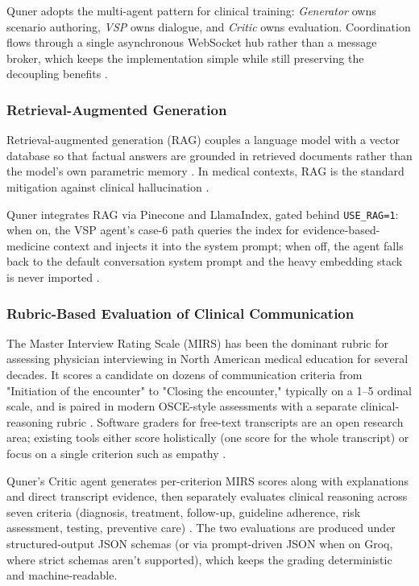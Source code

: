 \documentclass{article}
\begin{document}
Quner adopts the multi-agent pattern for clinical training: \emph{Generator} owns scenario authoring, \emph{VSP} owns dialogue, and \emph{Critic} owns evaluation. Coordination flows through a single asynchronous WebSocket hub rather than a message broker, which keeps the implementation simple while still preserving the decoupling benefits \cite{Cheptsov2013IntroducingAN}.

\subsubsection{Retrieval-Augmented Generation}

Retrieval-augmented generation (RAG) couples a language model with a vector database so that factual answers are grounded in retrieved documents rather than the model's own parametric memory \cite{Monir2024VectorSearchED,Rygl2017SemanticVE}. In medical contexts, RAG is the standard mitigation against clinical hallucination \cite{Mahajan2022TextualDQ}.

Quner integrates RAG via Pinecone and LlamaIndex, gated behind \texttt{USE\_RAG=1}: when on, the VSP agent's case-6 path queries the index for evidence-based-medicine context and injects it into the system prompt; when off, the agent falls back to the default conversation system prompt and the heavy embedding stack is never imported \cite{Zhao2023ASO}.

\subsubsection{Rubric-Based Evaluation of Clinical Communication}

The Master Interview Rating Scale (MIRS) has been the dominant rubric for assessing physician interviewing in North American medical education for several decades. It scores a candidate on dozens of communication criteria from "Initiation of the encounter" to "Closing the encounter," typically on a 1--5 ordinal scale, and is paired in modern OSCE-style assessments with a separate clinical-reasoning rubric \cite{Mahajan2022TextualDQ}. Software graders for free-text transcripts are an open research area; existing tools either score holistically (one score for the whole transcript) or focus on a single criterion such as empathy \cite{Krugmann2024SentimentAI}.

Quner's Critic agent generates per-criterion MIRS scores along with explanations and direct transcript evidence, then separately evaluates clinical reasoning across seven criteria (diagnosis, treatment, follow-up, guideline adherence, risk assessment, testing, preventive care) \cite{Krugmann2024SentimentAI}. The two evaluations are produced under structured-output JSON schemas (or via prompt-driven JSON when on Groq, where strict schemas aren't supported), which keeps the grading deterministic and machine-readable.
\end{document}
